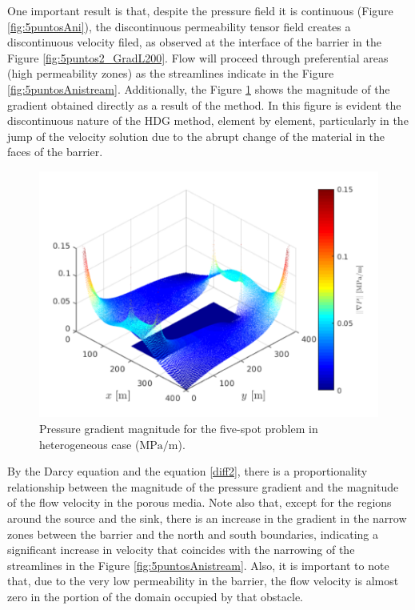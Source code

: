 \documentclass[review]{elsarticle}
\begin{document}
One important result is that, despite the pressure field it is continuous (Figure \ref{fig:5puntosAni}), the discontinuous permeability tensor field creates a discontinuous velocity filed, as observed at the interface of the barrier in the Figure \ref{fig:5puntos2_GradL200}.  Flow will proceed through preferential areas (high permeability zones) as the streamlines indicate in the Figure \ref{fig:5puntosAnistream}. Additionally, the Figure \ref{fig:grad} shows the magnitude of the gradient obtained directly as a result of the method. In this figure is evident the discontinuous nature of the HDG method, element by element, particularly in the jump of the velocity solution due to the abrupt change of the material in the faces of the barrier.


\begin{figure}[H]
	\centering
	\includegraphics[width=0.6\linewidth]{./Figures/Examples/FiveSpot_Hetero/disc_Grad}
	\caption[Test geometry 1]{Pressure gradient magnitude for the five-spot problem in heterogeneous case ($\mathrm{MPa}/\mathrm{m}$).}
	\label{fig:grad}
\end{figure}


By the Darcy equation and the equation \eqref{diff2}, there is a proportionality relationship between the magnitude of the pressure gradient and the magnitude of the flow velocity in the porous media. Note also that, except for the regions around the source and the sink, there is an increase in the gradient in the narrow zones between the barrier and the north and south boundaries, indicating a significant increase in velocity that coincides with the narrowing of the streamlines in the Figure \ref{fig:5puntosAnistream}. Also, it is important to note that, due to the very low permeability in the barrier, the flow velocity is almost zero in the portion of the domain occupied by that obstacle.
\end{document}
